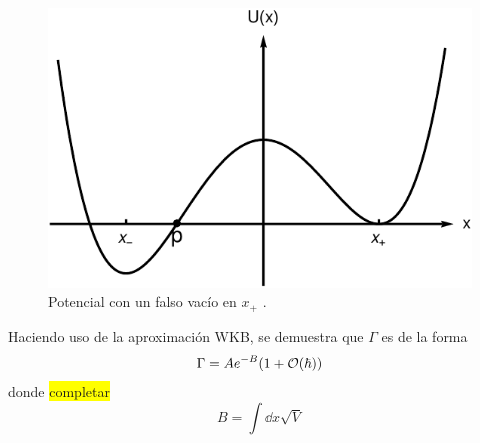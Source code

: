 \begin{figure}[h!]
	\centering
	\includegraphics[scale = 0.4]{../FIGURAS/potencial}
	\caption{Potencial con un falso vacío en $x_+$ \cite{Ai:2019dqr}.}
	\label{fig:potencial}
\end{figure}

Haciendo uso de la aproximación WKB, se demuestra que $\Gamma$ es de la forma \cite{coleman1977fate}
\begin{equation} \label{eq:gamma_WKB}
	\Gamma = Ae^{-B}\qty(1 + \order{\hbar})
\end{equation}
donde 
\colorbox{yellow}{completar}
\begin{equation} \label{B_WKB}
	B = \int \dd{x} \sqrt{V} 
\end{equation}





